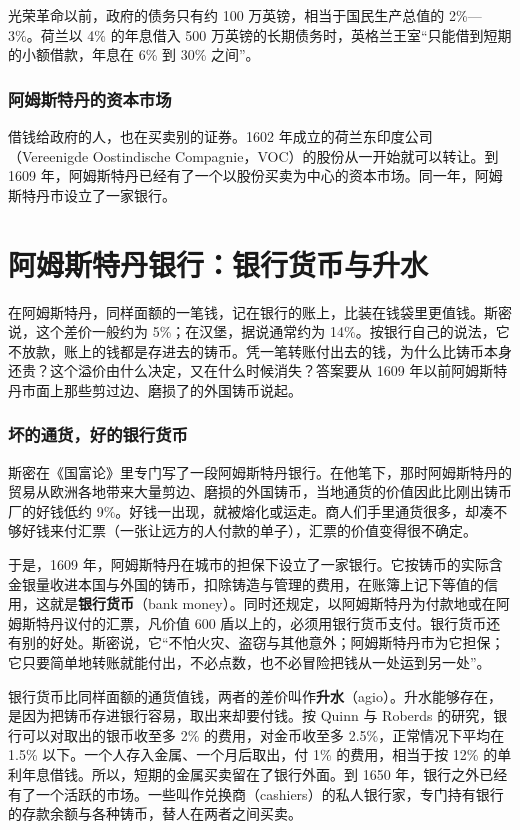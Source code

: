 光荣革命以前，政府的债务只有约 100 万英镑，相当于国民生产总值的 2\%—3\%。荷兰以 4\% 的年息借入 500 万英镑的长期债务时，英格兰王室“只能借到短期的小额借款，年息在 6\% 到 30\% 之间”\cite{nw1989}。

\subsubsection{阿姆斯特丹的资本市场}
借钱给政府的人，也在买卖别的证券。1602 年成立的荷兰东印度公司（Vereenigde Oostindische Compagnie，VOC）的股份从一开始就可以转让。到 1609 年，阿姆斯特丹已经有了一个以股份买卖为中心的资本市场\cite{gj2004}。同一年，阿姆斯特丹市设立了一家银行\cite{smith1776}。

\section{阿姆斯特丹银行：银行货币与升水}\label{sec:finrev-amsterdam}

在阿姆斯特丹，同样面额的一笔钱，记在银行的账上，比装在钱袋里更值钱。斯密说，这个差价一般约为 5\%；在汉堡，据说通常约为 14\%\cite{smith1776}。按银行自己的说法，它不放款，账上的钱都是存进去的铸币。凭一笔转账付出去的钱，为什么比铸币本身还贵？这个溢价由什么决定，又在什么时候消失？答案要从 1609 年以前阿姆斯特丹市面上那些剪过边、磨损了的外国铸币说起。

\subsubsection{坏的通货，好的银行货币}
斯密在《国富论》里专门写了一段阿姆斯特丹银行。在他笔下，那时阿姆斯特丹的贸易从欧洲各地带来大量剪边、磨损的外国铸币，当地通货的价值因此比刚出铸币厂的好钱低约 9\%。好钱一出现，就被熔化或运走。商人们手里通货很多，却凑不够好钱来付汇票（一张让远方的人付款的单子），汇票的价值变得很不确定\cite{smith1776}。

于是，1609 年，阿姆斯特丹在城市的担保下设立了一家银行。它按铸币的实际含金银量收进本国与外国的铸币，扣除铸造与管理的费用，在账簿上记下等值的信用，这就是\textbf{银行货币}（bank money）。同时还规定，以阿姆斯特丹为付款地或在阿姆斯特丹议付的汇票，凡价值 600 盾以上的，必须用银行货币支付。银行货币还有别的好处。斯密说，它“不怕火灾、盗窃与其他意外；阿姆斯特丹市为它担保；它只要简单地转账就能付出，不必点数，也不必冒险把钱从一处运到另一处”\cite{smith1776}。

银行货币比同样面额的通货值钱，两者的差价叫作\textbf{升水}（agio）。升水能够存在，是因为把铸币存进银行容易，取出来却要付钱。按 Quinn 与 Roberds 的研究，银行可以对取出的银币收至多 2\% 的费用，对金币收至多 2.5\%，正常情况下平均在 1.5\% 以下。一个人存入金属、一个月后取出，付 1\% 的费用，相当于按 12\% 的单利年息借钱\cite{qr2010}。所以，短期的金属买卖留在了银行外面。到 1650 年，银行之外已经有了一个活跃的市场。一些叫作兑换商（cashiers）的私人银行家，专门持有银行的存款余额与各种铸币，替人在两者之间买卖\cite{qr2010}。

